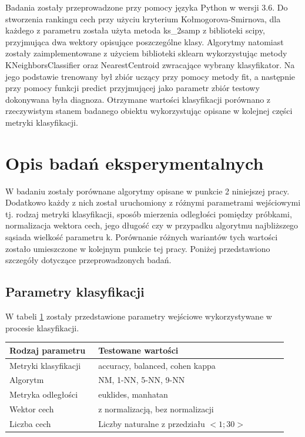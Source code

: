 \documentclass[12pt]{article}
\begin{document}
\indent Badania zostały przeprowadzone przy pomocy języka Python w wersji 3.6. Do stworzenia rankingu cech przy użyciu kryterium Kołmogorova-Smirnova, dla każdego z parametru została użyta metoda ks\_2samp z biblioteki scipy, przyjmująca dwa wektory opisujące poszczególne klasy. Algorytmy natomiast zostały zaimplementowane z użyciem biblioteki sklearn wykorzystując metody KNeighborsClassifier oraz NearestCentroid zwracające wybrany klasyfikator. Na jego podstawie trenowany był zbiór uczący przy pomocy metody fit, a następnie przy pomocy funkcji predict przyjmującej jako parametr zbiór testowy dokonywana była diagnoza. Otrzymane wartości klasyfikacji porównano z rzeczywistym stanem badanego obiektu wykorzystując opisane w kolejnej części metryki klasyfikacji.


\section{Opis badań eksperymentalnych}
\indent W badaniu zostały porównane algorytmy opisane w punkcie 2 niniejszej pracy. Dodatkowo każdy z nich został uruchomiony z różnymi parametrami wejściowymi tj. rodzaj metryki klasyfikacji, sposób mierzenia odległości pomiędzy próbkami, normalizacja wektora cech, jego długość czy w przypadku algorytmu najbliższego sąsiada wielkość parametru k. Porównanie różnych wariantów tych wartości zostało umieszczone w kolejnym punkcie tej pracy. Poniżej przedstawiono szczegóły dotyczące przeprowadzonych badań.\\

\subsection{Parametry klasyfikacji}
W tabeli \ref{parametry_klasyfiacji} zostały przedstawione parametry wejściowe wykorzystywane w procesie klasyfikacji.
\begin{table}[H]
\label{parametry_klasyfiacji}
	\begin{tabular}{|p{0.3\linewidth}|p{0.64\linewidth}|}%
	\hline\centering
	Rodzaj parametru 	& Testowane wartości 		\\ \hline\centering
	Metryki klasyfikacji	& accuracy, balanced, cohen kappa \\ \hline\centering
	Algorytm	& NM, 1-NN, 5-NN, 9-NN \\ \hline\centering
	Metryka odległości	& euklides, manhatan \\ \hline\centering
	Wektor cech	& z normalizacją, bez normalizacji \\ \hline\centering
	Liczba cech	& Liczby naturalne z przedziału $<1;30>$ \\ \hline
	\end{tabular}
\end{table}
\end{document}
